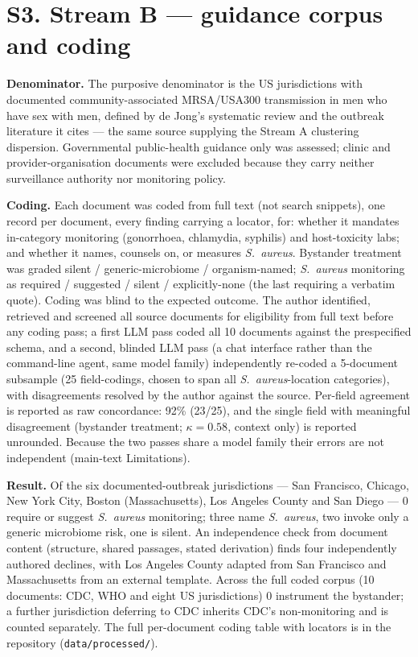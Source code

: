 \documentclass[11pt,a4paper]{article}
\newcommand{\sa}{\emph{S.~aureus}}
\begin{document}
\section*{S3. Stream B --- guidance corpus and coding}

\textbf{Denominator.} The purposive denominator is the US jurisdictions with
documented community-associated MRSA/USA300 transmission in men who have sex with
men, defined by de Jong's systematic review and the outbreak literature it cites
--- the same source supplying the Stream A clustering dispersion. Governmental
public-health guidance only was assessed; clinic and provider-organisation
documents were excluded because they carry neither surveillance authority nor
monitoring policy.

\textbf{Coding.} Each document was coded from full text (not search snippets), one
record per document, every finding carrying a locator, for: whether it mandates
in-category monitoring (gonorrhoea, chlamydia, syphilis) and host-toxicity labs;
and whether it names, counsels on, or measures \sa{}. Bystander treatment was
graded silent / generic-microbiome / organism-named; \sa{} monitoring as required
/ suggested / silent / explicitly-none (the last requiring a verbatim quote).
Coding was blind to the expected outcome. The author identified, retrieved and
screened all source documents for eligibility from full text before any coding
pass; a first LLM pass coded all 10 documents against the prespecified schema, and
a second, blinded LLM pass (a chat interface rather than the command-line agent,
same model family) independently re-coded a 5-document subsample (25 field-codings,
chosen to span all \sa{}-location categories), with disagreements resolved by the
author against the source. Per-field agreement is reported as raw concordance:
92\% (23/25), and the single field with meaningful disagreement (bystander
treatment; $\kappa=0.58$, context only) is reported unrounded. Because the two
passes share a model family their errors are not independent (main-text
Limitations).

\textbf{Result.} Of the six documented-outbreak jurisdictions --- San Francisco,
Chicago, New York City, Boston (Massachusetts), Los Angeles County and San Diego
--- 0 require or suggest \sa{} monitoring; three name \sa{}, two invoke only a
generic microbiome risk, one is silent. An independence check from document
content (structure, shared passages, stated derivation) finds four independently
authored declines, with Los Angeles County adapted from San Francisco and
Massachusetts from an external template. Across the full coded corpus (10
documents: CDC, WHO and eight US jurisdictions) 0 instrument the bystander; a
further jurisdiction deferring to CDC inherits CDC's non-monitoring and is counted
separately. The full per-document coding table with locators is in the repository
(\texttt{data/processed/}).
\end{document}
